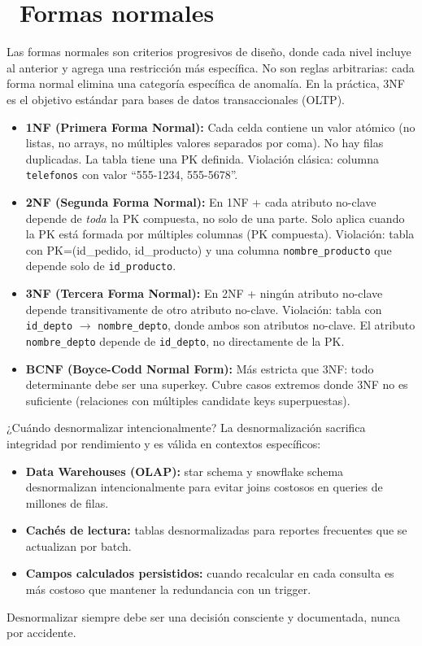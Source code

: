 \section[Formas normales]{~Formas normales}

Las formas normales son criterios progresivos de diseño, donde cada nivel incluye al anterior y agrega una restricción más específica.
No son reglas arbitrarias: cada forma normal elimina una categoría específica de anomalía.
En la práctica, 3NF es el objetivo estándar para bases de datos transaccionales (OLTP).

\begin{itemize}
  \item \textbf{1NF (Primera Forma Normal):}
    Cada celda contiene un valor atómico (no listas, no arrays, no múltiples valores separados por coma).
    No hay filas duplicadas. La tabla tiene una PK definida.
    Violación clásica: columna \texttt{telefonos} con valor ``555-1234, 555-5678''.

  \item \textbf{2NF (Segunda Forma Normal):}
    En 1NF + cada atributo no-clave depende de \emph{toda} la PK compuesta, no solo de una parte.
    Solo aplica cuando la PK está formada por múltiples columnas (PK compuesta).
    Violación: tabla con PK=(id\_pedido, id\_producto) y una columna \texttt{nombre\_producto} que depende solo de \texttt{id\_producto}.

  \item \textbf{3NF (Tercera Forma Normal):}
    En 2NF + ningún atributo no-clave depende transitivamente de otro atributo no-clave.
    Violación: tabla con \texttt{id\_depto} $\to$ \texttt{nombre\_depto}, donde ambos son atributos no-clave.
    El atributo \texttt{nombre\_depto} depende de \texttt{id\_depto}, no directamente de la PK.

  \item \textbf{BCNF (Boyce-Codd Normal Form):}
    Más estricta que 3NF: todo determinante debe ser una superkey.
    Cubre casos extremos donde 3NF no es suficiente (relaciones con múltiples candidate keys superpuestas).
\end{itemize}

\begin{tipbox}{¿Cuándo desnormalizar intencionalmente?}
La desnormalización sacrifica integridad por rendimiento y es válida en contextos específicos:
\begin{itemize}
  \item \textbf{Data Warehouses (OLAP):} star schema y snowflake schema desnormalizan intencionalmente para evitar joins costosos en queries de millones de filas.
  \item \textbf{Cachés de lectura:} tablas desnormalizadas para reportes frecuentes que se actualizan por batch.
  \item \textbf{Campos calculados persistidos:} cuando recalcular en cada consulta es más costoso que mantener la redundancia con un trigger.
\end{itemize}
Desnormalizar siempre debe ser una decisión consciente y documentada, nunca por accidente.
\end{tipbox}

